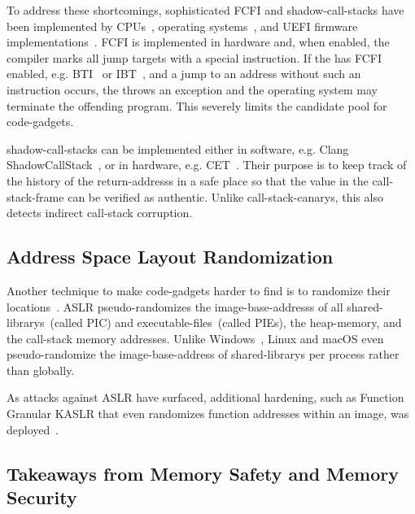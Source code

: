 To address these shortcomings, sophisticated \gls{FCFI} and \glspl{shadow-call-stack} have been implemented by \glspl{CPU}~\cite{ia32,arm-isa}, operating systems~\cite{linux-arm-bti}, and \gls{UEFI} firmware implementations~\cite{uefi-spec,edk2}. \Gls{FCFI} is implemented in hardware and, when enabled, the compiler marks all jump targets with a special instruction. If the  has \gls{FCFI} enabled, e.g. \gls{BTI}~\cite{arm-isa} or \gls{IBT}~\cite{ia32}, and a jump to an address without such an instruction occurs, the  throws an exception and the operating system may terminate the offending program. This severely limits the candidate pool for \glspl{code-gadget}.

\Glspl{shadow-call-stack} can be implemented either in software, e.g. Clang ShadowCallStack~\cite{clang-csc}, or in hardware, e.g.  \gls{CET}~\cite{ia32}. Their purpose is to keep track of the history of the \glspl{return-address} in a safe place so that the value in the \gls{call-stack-frame} can be verified as authentic. Unlike \glspl{call-stack-canary}, this also detects indirect \gls{call-stack} corruption.

\subsection{Address Space Layout Randomization}
\label{sec:aslr}

Another technique to make \glspl{code-gadget} harder to find is to randomize their locations~\cite{10.1007/978-3-642-33338-5_5,ms-aslr}. \Gls{ASLR} pseudo-randomizes the \glspl{image-base-address} of all \glspl{shared-library}~(called \gls{PIC}) and \glspl{executable-file}~(called \glspl{PIE}), the \gls{heap-memory}, and the \gls{call-stack} memory addresses. Unlike Windows~\cite{ms-dll-base-addr}, Linux and macOS even pseudo-randomize the \gls{image-base-address} of \glspl{shared-library} per process rather than globally.

As attacks against \gls{ASLR} have surfaced, additional hardening, such as Function Granular \gls{KASLR} that even randomizes function addresses within an \gls{image}, was deployed~\cite{fgkaslr}.

\subsection{Takeaways from Memory Safety and Memory Security}

